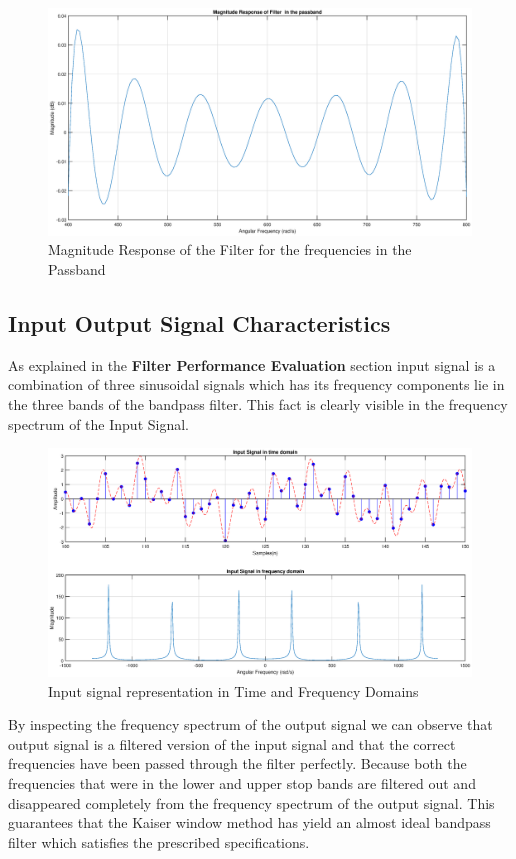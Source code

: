 \documentclass[a4paper,11pt]{article}%
\begin{document}
\begin{figure}[!h]
	\centering
	\includegraphics[scale=0.4]{figures/magnitude-resp-passband}
	\caption{Magnitude Response of the Filter for the frequencies in the Passband}
\end{figure}

\pagebreak
\subsection{Input Output Signal Characteristics}

As explained in the \textbf{Filter Performance Evaluation} section input signal is a combination of three sinusoidal signals which has its frequency components lie in the three bands of the bandpass filter. This fact is clearly visible in the frequency spectrum of the Input Signal.

\begin{figure}[!h]
	\centering
	\includegraphics[scale=0.45]{figures/input-signal}
	\caption{Input signal representation in Time and Frequency Domains}
\end{figure}
\vfill
By inspecting the frequency spectrum of the output signal we can observe that output signal is a filtered version of the input signal and that the correct frequencies have been passed through the filter perfectly. Because both the frequencies that were in the lower and upper stop bands are filtered out and disappeared completely from the frequency spectrum of the output signal. This guarantees that the Kaiser window method has  yield an almost ideal bandpass filter which satisfies the prescribed specifications.
\end{document}

